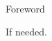 
\renewcommand{\baselinestretch}{2}
\small\normalsize
\hbox{\ }
 
\vspace{.5in}

\begin{center}
\large{Foreword} 
\end{center} 

If needed.
